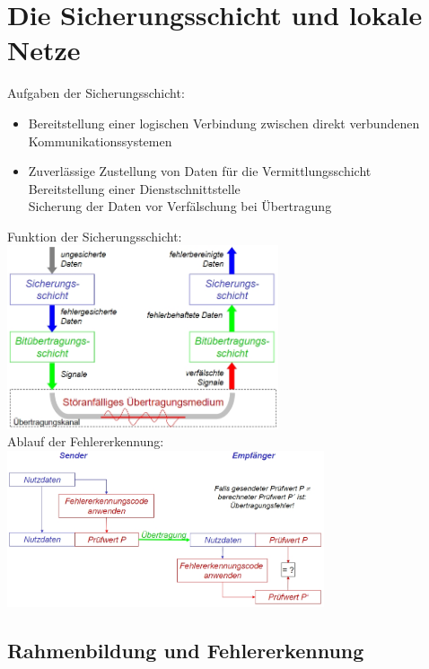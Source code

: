 \documentclass{scrreprt}
\begin{document}
\chapter{Die Sicherungsschicht und lokale Netze}
Aufgaben der Sicherungsschicht:
\begin{itemize}
	\item Bereitstellung einer logischen Verbindung zwischen direkt verbundenen Kommunikationssystemen
	\item Zuverlässige Zustellung von Daten für die Vermittlungsschicht
	\\Bereitstellung einer Dienstschnittstelle
	\\Sicherung der Daten vor Verfälschung bei Übertragung
\end{itemize}
Funktion der Sicherungsschicht:
\\\includegraphics[width=0.60\textwidth]{"graphics/Funktion-Sschicht"}
\\Ablauf der Fehlererkennung:
\\\includegraphics[width=0.70\textwidth]{"graphics/Ablauf"}
\section{Rahmenbildung und Fehlererkennung}
\end{document}

